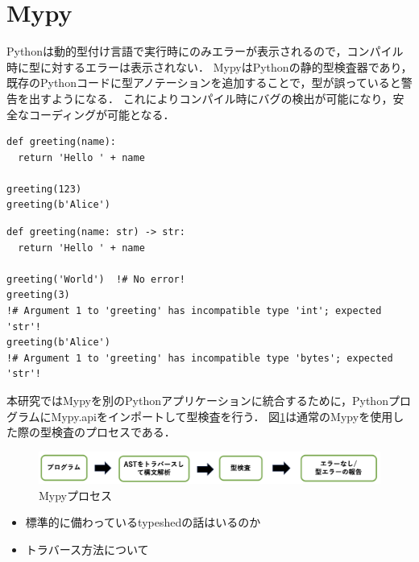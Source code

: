 \documentclass{thesis}
\begin{document}
\section{Mypy}
Pythonは動的型付け言語で実行時にのみエラーが表示されるので，コンパイル時に型に対するエラーは表示されない．
Mypy\cite{Mypy}はPythonの静的型検査器であり，既存のPythonコードに型アノテーションを追加することで，型が誤っていると警告を出すようになる．
これによりコンパイル時にバグの検出が可能になり，安全なコーディングが可能となる．
\begin{lstlisting}[caption=型注釈のないPythonコード]
def greeting(name):
  return 'Hello ' + name

greeting(123)
greeting(b'Alice')
\end{lstlisting}
\begin{lstlisting}[caption=型注釈のあるPythonコード]
def greeting(name: str) -> str:
  return 'Hello ' + name

greeting('World')  !# No error!
greeting(3)         
!# Argument 1 to 'greeting' has incompatible type 'int'; expected 'str'!
greeting(b'Alice')  
!# Argument 1 to 'greeting' has incompatible type 'bytes'; expected 'str'!
\end{lstlisting}
本研究ではMypyを別のPythonアプリケーションに統合するために，PythonプログラムにMypy.apiをインポートして型検査を行う．
図\ref{mypyproc}は通常のMypyを使用した際の型検査のプロセスである．
\begin{figure}[H]
  \centering
  \includegraphics[scale=0.6]{image/mypyprocess.png}
  \caption{Mypyプロセス}
  \label{mypyproc}
\end{figure}

\begin{itemize}
  \item 標準的に備わっているtypeshedの話はいるのか
  \item トラバース方法について
\end{itemize}
\end{document}
